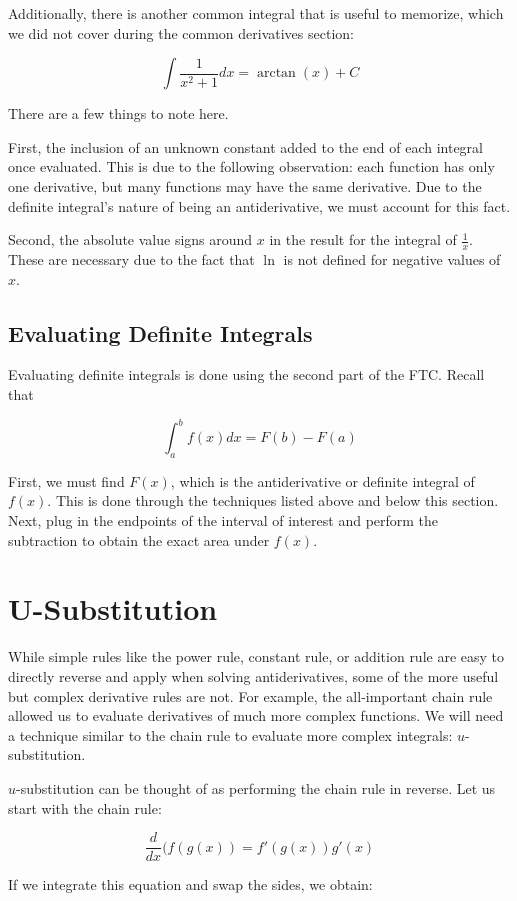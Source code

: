 \documentclass[11pt]{article}
\begin{document}
Additionally, there is another common integral that is useful to memorize, which we did not cover during the common derivatives section:

\[ \int \frac{1}{x^2+1} dx = \arctan(x) + C \]

There are a few things to note here. 

First, the inclusion of an unknown constant added to the end of each integral once evaluated. This is due to the following observation: each function has only one derivative, but many functions may have the same derivative. Due to the definite integral's nature of being an antiderivative, we must account for this fact.

Second, the absolute value signs around $x$ in the result for the integral of $\frac{1}{x}$. These are necessary due to the fact that $\ln$ is not defined for negative values of $x$.

\subsection{Evaluating Definite Integrals}

Evaluating definite integrals is done using the second part of the FTC. Recall that 

\[ \int_{a}^{b} f(x) dx = F(b) - F(a) \]

First, we must find $F(x)$, which is the antiderivative or definite integral of $f(x)$. This is done through the techniques listed above and below this section. Next, plug in the endpoints of the interval of interest and perform the subtraction to obtain the exact area under $f(x)$.

\section{U-Substitution}
While simple rules like the power rule, constant rule, or addition rule are easy to directly reverse and apply when solving antiderivatives, some of the more useful but complex derivative rules are not. For example, the all-important chain rule allowed us to evaluate derivatives of much more complex functions. We will need a technique similar to the chain rule to evaluate more complex integrals: $u$-substitution.

$u$-substitution can be thought of as performing the chain rule in reverse. Let us start with the chain rule:

\[ \frac{d}{dx}(f(g(x)) = f'(g(x))g'(x) \]

If we integrate this equation and swap the sides, we obtain:
\end{document}
